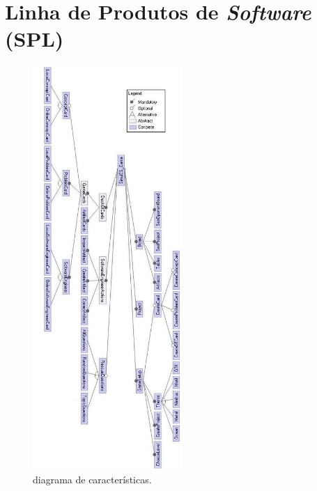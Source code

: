 \documentclass[11pt]{article}
\begin{document}
\section{Linha de Produtos de \emph{Software} (SPL)}
\label{sec:org038cc19}
\begin{figure}[H]
\centering
\includegraphics[height=580px]{./img/features.jpeg}
\caption{diagrama de características.}
\end{figure} 
\end{document}
